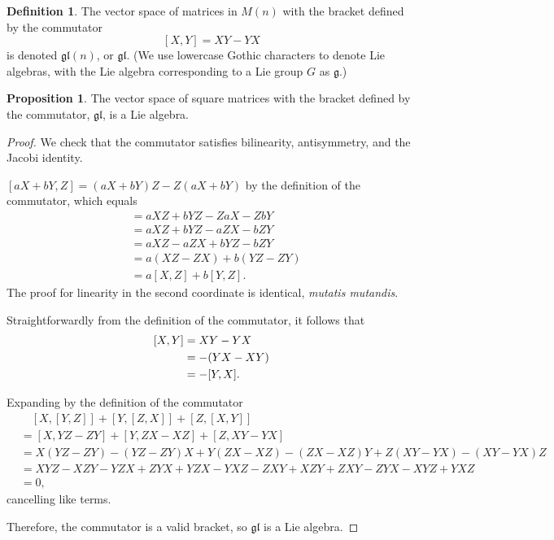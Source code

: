 \documentclass[12pt]{article}
\newcommand{\g}{\mathfrak{g}}
\newcommand{\gl}{\mathfrak{gl}}
\theoremstyle{definition}
\newtheorem{prop}[them]{Proposition}
\theoremstyle{definition}
\theoremstyle{definition}
\theoremstyle{definition}
\theoremstyle{definition}
\newtheorem{defn}[them]{Definition}
\theoremstyle{definition}
\theoremstyle{definition}
\theoremstyle{definition}
\begin{document}
\begin{defn} 
The vector space of matrices in
$M(n)$ with the bracket defined by the commutator 
\[
    [X, Y] = XY - YX
\] 
is denoted $\gl(n)$, or $\gl$. (We use lowercase Gothic characters to
denote Lie algebras, with the Lie algebra
corresponding to a Lie
group $G$ as $\g$.)
\end{defn}

\begin{prop} 
The vector space of square matrices with the
bracket defined by the commutator, $\gl$, is a Lie
algebra.
\end{prop}
\begin{proof}
\par{We check that the commutator satisfies
bilinearity, antisymmetry, and the Jacobi
identity.}

\par{$[aX + bY, Z] = (aX + bY)Z - Z(aX + bY)$ by
the definition of the commutator, which equals
\[
\begin{aligned}
    & = aXZ + bYZ - ZaX - ZbY \\
    & = aXZ + bYZ - aZX - bZY \\
    & = aXZ - aZX + bYZ - bZY \\
    & = a(XZ - ZX) + b(YZ - ZY) \\
    & = a[X, Z] + b[Y, Z].
\end{aligned}
\] 
The proof for linearity in the second coordinate
is identical, \textit{mutatis mutandis}.}

\par{Straightforwardly from the definition of the
commutator, it follows that
\[
\begin{aligned}
    \relax [X, Y] & = XY - YX \\ 
    & = -(YX - XY) \\ 
    & = -[Y,X].
\end{aligned}
\]}

\par{Expanding by the definition of the commutator 
\[
\begin{aligned} 
    &\quad [X, [Y, Z]] + [Y, [Z, X]] + [Z, [X, Y]] \\ 
    & = [X, YZ - ZY] + [Y, ZX - XZ] + [Z, XY - YX] \\
    & = X(YZ - ZY) - (YZ-ZY)X + Y(ZX-XZ) - (ZX-XZ)Y + Z(XY-YX) - (XY-YX)Z \\
    & = XYZ - XZY - YZX + ZYX + YZX - YXZ - ZXY + XZY + ZXY - ZYX - XYZ + YXZ \\
    & = 0,
\end{aligned}
\] 
cancelling like terms.}

\par{Therefore, the commutator is a valid bracket,
so $\gl$ is a Lie algebra.}
\end{proof}
\end{document}
